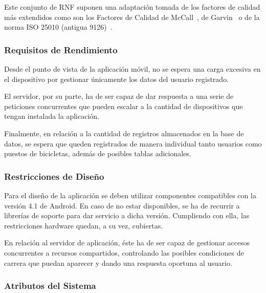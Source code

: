 Este conjunto de RNF suponen una adaptación tomada de los factores de calidad más extendidos como son los Factores de Calidad de McCall~\cite{McC77}, de Garvin~\cite{Gar87} o de la norma ISO 25010 (antigua 9126)~\cite{ISO25}.

\subsubsection{Requisitos de Rendimiento}

Desde el punto de vista de la aplicación móvil, no se espera una carga excesiva en el dispositivo por gestionar únicamente los datos del usuario registrado.

El servidor, por su parte, ha de ser capaz de dar respuesta a una serie de peticiones concurrentes que pueden escalar a la cantidad de dispositivos que tengan instalada la aplicación.

Finalmente, en relación a la cantidad de registros almacenados en la base de datos, se espera que queden registrados de manera individual tanto usuarios como puestos de bicicletas, además de posibles tablas adicionales.

\subsubsection{Restricciones de Diseño}

Para el diseño de la aplicación se deben utilizar componentes compatibles con la versión 4.1 de Android. En caso de no estar disponibles, se ha de recurrir a librerías de soporte para dar servicio a dicha versión. Cumpliendo con ella, las restricciones hardware quedan, a su vez, cubiertas.

En relación al servidor de aplicación, éste ha de ser capaz de gestionar accesos concurrentes a recursos compartidos, controlando las posibles condiciones de carrera que puedan aparecer y dando una respuesta oportuna al usuario. 

\subsubsection{Atributos del Sistema}

